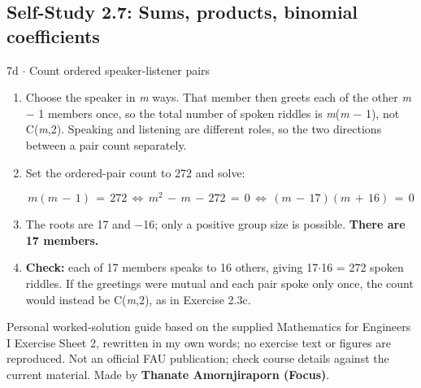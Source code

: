 \documentclass[11pt]{article}
\begin{document}
\begin{keepsection}\subsection{Self-Study 2.7: Sums, products, binomial coefficients}

\begin{workedbox}{7d \ensuremath{\cdot} Count ordered speaker-listener pairs}
\begin{enumerate}
\item Choose the speaker in \textit{m} ways. That member then greets each of the other \textit{m} \ensuremath{-} 1 members once, so the total number of spoken riddles is \textit{m}(\textit{m} \ensuremath{-} 1), not C(\textit{m},2). Speaking and listening are different roles, so the two directions between a pair count separately.
\item {}
Set the ordered-pair count to 272 and solve:

\begin{equation*}{m}({m}\, -\, 1)\, =\, 272\, \Leftrightarrow \, {m}^{2}\, -\, {m}\, -\, 272\, =\, 0\, \Leftrightarrow \, ({m}\, -\, 17)({m}\, +\, 16)\, =\, 0\end{equation*}
\item The roots are 17 and \ensuremath{-}16; only a positive group size is possible. \textbf{There are 17 members.}
\item \textbf{Check:} each of 17 members speaks to 16 others, giving 17\ensuremath{\cdot}16 = 272 spoken riddles. If the greetings were mutual and each pair spoke only once, the count would instead be C(\textit{m},2), as in Exercise 2.3c.
\end{enumerate}
\end{workedbox}

\end{keepsection}

\vfill{\small Personal worked-solution guide based on the supplied Mathematics for Engineers I Exercise Sheet 2, rewritten in my own words; no exercise text or figures are reproduced. Not an official FAU publication; check course details against the current material. Made by \textbf{Thanate Amornjiraporn (Focus)}.}
\end{document}
